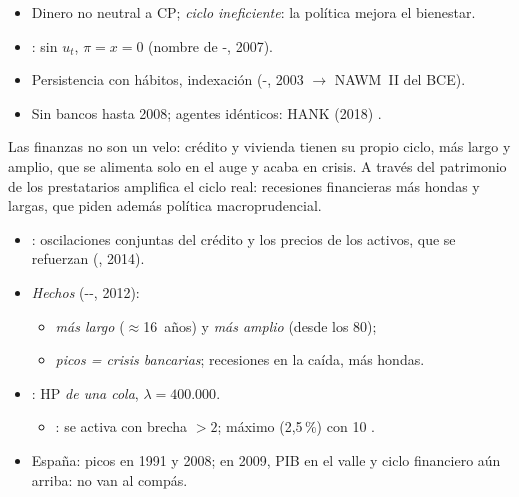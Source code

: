 \documentclass{article}
\begin{document}
\begin{columnas}
\begin{itemize}
\item Dinero no neutral a CP; \emph{ciclo ineficiente}: la política mejora el bienestar.
\item {}: sin $u_t$, $\pi=x=0$ (nombre de -, 2007).
\item Persistencia con hábitos, indexación (-, 2003 $\to$ NAWM~II del BCE).
\item Sin bancos hasta 2008; agentes idénticos: HANK (2018) .
\end{itemize}

\begin{ideaclave}
Las finanzas no son un velo: crédito y vivienda tienen su propio ciclo, más largo y amplio, que se alimenta solo en el auge y acaba en crisis. A través del patrimonio de los prestatarios amplifica el ciclo real: recesiones financieras más hondas y largas, que piden además política macroprudencial.
\end{ideaclave}

\begin{itemize}
\item {}: oscilaciones conjuntas del crédito y los precios de los activos, que se refuerzan (, 2014).
\item \emph{Hechos} (--, 2012):
  \begin{itemize}
  \item \emph{más largo} ($\approx$16~años) y \emph{más amplio} (desde los 80);
  \item \emph{picos = crisis bancarias}; recesiones en la caída, más hondas.
  \end{itemize}
\item {}: HP \emph{de una cola}, $\lambda=400.000$.
  \begin{itemize}
  \item {}: se activa con brecha $>2$; máximo (2,5\,\%) con 10 .
  \end{itemize}
\end{itemize}
\begin{itemize}
\item España: picos en 1991 y 2008; en 2009, PIB en el valle y ciclo financiero aún arriba: no van al compás.
\end{itemize}


\end{columnas}
\end{document}
